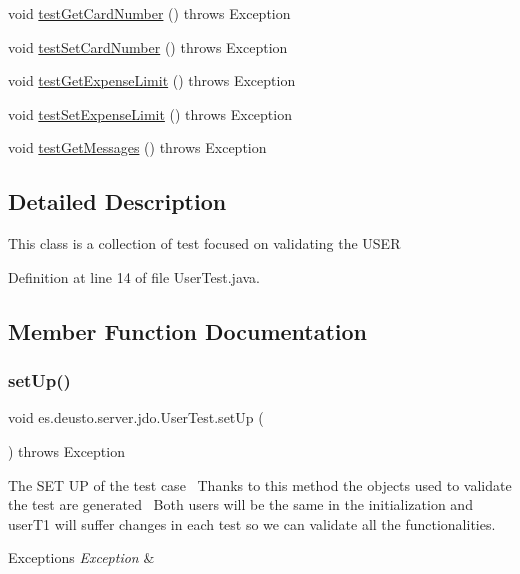\begin{DoxyCompactItemize}
void \hyperlink{classes_1_1deusto_1_1server_1_1jdo_1_1_user_test_ad84d7265ac6d2d4a9e9f3d42e80b8baf}{test\+Get\+Card\+Number} ()  throws Exception 
\item 
void \hyperlink{classes_1_1deusto_1_1server_1_1jdo_1_1_user_test_a944d9dbc5220860bbc5a8eeaf013d54e}{test\+Set\+Card\+Number} ()  throws Exception 
\item 
void \hyperlink{classes_1_1deusto_1_1server_1_1jdo_1_1_user_test_ac9953cb0f85111b005a731bc9706a3b5}{test\+Get\+Expense\+Limit} ()  throws Exception 
\item 
void \hyperlink{classes_1_1deusto_1_1server_1_1jdo_1_1_user_test_a62ce453431218996d80c2f0f57249513}{test\+Set\+Expense\+Limit} ()  throws Exception 
\item 
void \hyperlink{classes_1_1deusto_1_1server_1_1jdo_1_1_user_test_a73c44236a983959ce39adbd4803c83c1}{test\+Get\+Messages} ()  throws Exception 
\end{DoxyCompactItemize}


\subsection{Detailed Description}
This class is a collection of test focused on validating the U\+S\+ER 

Definition at line 14 of file User\+Test.\+java.



\subsection{Member Function Documentation}
\mbox{\label{classes_1_1deusto_1_1server_1_1jdo_1_1_user_test_ae4f4cc3f32659a36b3c5853d7789ccc5}} 
\subsubsection{\texorpdfstring{set\+Up()}{setUp()}}
{\footnotesize\ttfamily void es.\+deusto.\+server.\+jdo.\+User\+Test.\+set\+Up (\begin{DoxyParamCaption}{ }\end{DoxyParamCaption}) throws Exception}

The S\+ET UP of the test case~\newline
Thanks to this method the objects used to validate the test are generated~\newline
Both users will be the same in the initialization and user\+T1 will suffer changes in each test so we can validate all the functionalities. 
\begin{DoxyExceptions}{Exceptions}
{\em Exception} & \\
\hline
\end{DoxyExceptions}


